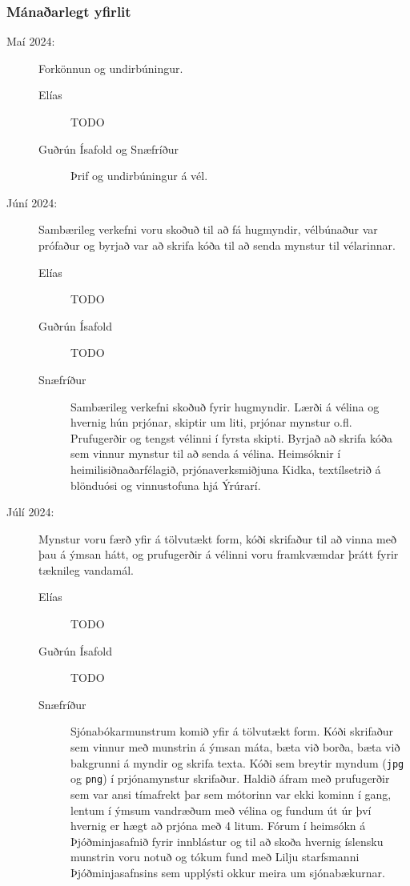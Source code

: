 \documentclass[a4paper,12pt,twoside]{article}
\begin{document}
\subsubsection{Mánaðarlegt yfirlit}
\begin{description}
    \item[Maí 2024:] Forkönnun og undirbúningur.  
    \begin{description}
        \item[Elías] TODO
        \item[Guðrún Ísafold og Snæfríður] Þrif og undirbúningur á vél.
    \end{description}
    \item[Júní 2024:] Sambærileg verkefni voru skoðuð til að fá hugmyndir, vélbúnaður var prófaður og byrjað var að skrifa kóða til að senda mynstur til vélarinnar.
    \begin{description}
        \item[Elías] TODO
        \item[Guðrún Ísafold] TODO
        \item[Snæfríður] Sambærileg verkefni skoðuð fyrir hugmyndir. Lærði á vélina og hvernig hún prjónar, skiptir um liti, prjónar mynstur o.fl. Prufugerðir og tengst vélinni í fyrsta skipti. Byrjað að skrifa kóða sem vinnur mynstur til að senda á vélina. Heimsóknir í heimilisiðnaðarfélagið, prjónaverksmiðjuna Kidka, textílsetrið á blönduósi og vinnustofuna hjá Ýrúrarí.
    \end{description}
    \item[Júlí 2024:]  Mynstur voru færð yfir á tölvutækt form, kóði skrifaður til að vinna með þau á ýmsan hátt, og prufugerðir á vélinni voru framkvæmdar þrátt fyrir tæknileg vandamál.
    \begin{description}
        \item[Elías] TODO
        \item[Guðrún Ísafold] TODO
        \item[Snæfríður] Sjónabókarmunstrum komið yfir á tölvutækt form. Kóði skrifaður sem vinnur með munstrin á ýmsan máta, bæta við borða, bæta við bakgrunni á myndir og skrifa texta. Kóði sem breytir myndum (\texttt{jpg} og \texttt{png}) í prjónamynstur skrifaður. Haldið áfram með prufugerðir sem var ansi tímafrekt þar sem mótorinn var ekki kominn í gang, lentum í ýmsum vandræðum með vélina og fundum út úr því hvernig er hægt að prjóna með 4 litum. Fórum í heimsókn á Þjóðminjasafnið fyrir innblástur og til að skoða hvernig íslensku munstrin voru notuð og tókum fund með Lilju starfsmanni Þjóðminjasafnsins sem upplýsti okkur meira um sjónabækurnar.

\end{description}
\end{description}
\end{document}
